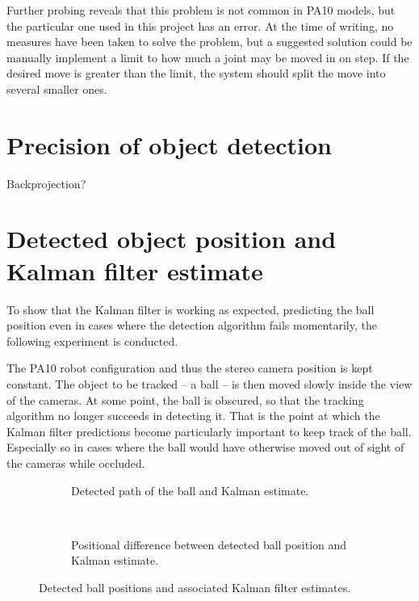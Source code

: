 Further probing reveals that this problem is not common in PA10 models, but the particular one used in this project has an error.
At the time of writing, no measures have been taken to solve the problem, but a suggested solution could be manually implement a limit to how much a joint may be moved in on step.
If the desired move is greater than the limit, the system should split the move into several smaller ones.


\section{Precision of object detection}
Backprojection?


\section{Detected object position and Kalman filter estimate}
To show that the Kalman filter is working as expected, predicting the ball position even in cases where the detection algorithm fails momentarily, the following experiment is conducted.

The PA10 robot configuration and thus the stereo camera position is kept constant.
The object to be tracked -- a ball -- is then moved slowly inside the view of the cameras.
At some point, the ball is obscured, so that the tracking algorithm no longer succeeds in detecting it.
That is the point at which the Kalman filter predictions become particularly important to keep track of the ball.
Especially so in cases where the ball would have otherwise moved out of sight of the cameras while occluded.

\begin{figure}[htb]
    \centering
    \begin{subfigure}[b]{0.49\textwidth}
        \resizebox{\columnwidth}{!}{%
            
        }
        \caption{Detected path of the ball and Kalman estimate.}
        \label{fig:ball_kalman_3d}
    \end{subfigure}~
    \begin{subfigure}[b]{0.49\textwidth}
        \resizebox{\columnwidth}{!}{%
            
        }
        \caption{Positional difference between detected ball position and Kalman estimate.}
        \label{fig:ball_kalman_error}
    \end{subfigure}
    \caption{Detected ball positions and associated Kalman filter estimates.}
    \label{fig:kalman_test}
\end{figure}

